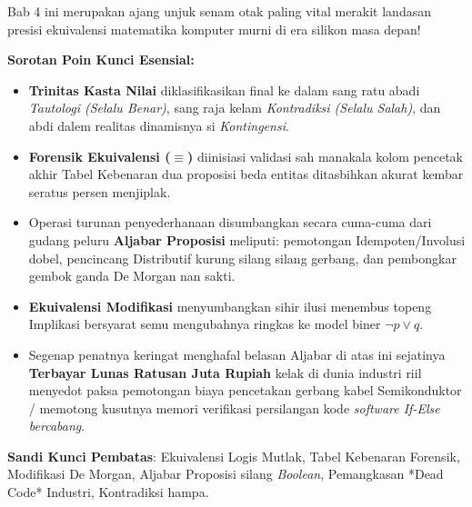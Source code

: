 \documentclass[../main]{subfiles}
\begin{document}

\begin{rangkuman}
Bab 4 ini merupakan ajang unjuk senam otak paling vital merakit landasan presisi ekuivalensi matematika komputer murni di era silikon masa depan!

\textbf{Sorotan Poin Kunci Esensial:}
\begin{itemize}
  \item \textbf{Trinitas Kasta Nilai} diklasifikasikan final ke dalam sang ratu abadi \textit{Tautologi (Selalu Benar)}, sang raja kelam \textit{Kontradiksi (Selalu Salah)}, dan abdi dalem realitas dinamisnya si \textit{Kontingensi}.
  \item \textbf{Forensik Ekuivalensi ($\equiv$)} diinisiasi validasi sah manakala kolom pencetak akhir Tabel Kebenaran dua proposisi beda entitas ditasbihkan akurat kembar seratus persen menjiplak.
  \item Operasi turunan penyederhanaan disumbangkan secara cuma-cuma dari gudang peluru \textbf{Aljabar Proposisi} meliputi: pemotongan Idempoten/Involusi dobel, pencincang Distributif kurung silang silang gerbang, dan pembongkar gembok ganda De Morgan nan sakti.
  \item \textbf{Ekuivalensi Modifikasi} menyumbangkan sihir ilusi menembus topeng Implikasi bersyarat semu mengubahnya ringkas ke model biner $\neg p \lor q$.
  \item Segenap penatnya keringat menghafal belasan Aljabar di atas ini sejatinya \textbf{Terbayar Lunas Ratusan Juta Rupiah} kelak di dunia industri riil menyedot paksa pemotongan biaya pencetakan gerbang kabel Semikonduktor / memotong kusutnya memori verifikasi persilangan kode \textit{software If-Else bercabang}.
\end{itemize}

\textbf{Sandi Kunci Pembatas}: Ekuivalensi Logis Mutlak, Tabel Kebenaran Forensik, Modifikasi De Morgan, Aljabar Proposisi silang \textit{Boolean}, Pemangkasan *Dead Code* Industri, Kontradiksi hampa.
\end{rangkuman}

\ifSubfilesClassLoaded{
  \renewcommand{\bibname}{Daftar Pustaka}
  
  
}{}
\end{document}
